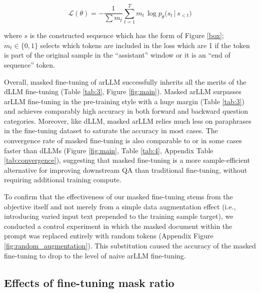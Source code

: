 \vskip -0.1in
\begin{equation}
\mathcal{L}(\theta) = - \frac{1}{\sum m_{t}}
\sum_{t=1}^{T} m_{t}\, \log p_{\theta}\!\big(s_{t}\,\big|\,s_{< t}\big)
\label{eq:2}
\end{equation}
\vskip -0.1in

where $s$ is the constructed sequence which has the form of Figure \ref{box}; $m_t\in\{0,1\}$ selects which tokens are included in the loss which are 1 if the token is part of the original sample in the ``assistant'' window or it is an ``end of sequence'' token.


Overall, masked fine-tuning of arLLM successfully inherits all the merits of the dLLM fine-tuning (Table \ref{tab:3}, Figure \ref{fig:main}). Masked arLLM surpasses arLLM fine-tuning in the pre-training style with a huge margin (Table \ref{tab:3}) and achieves comparably high accuracy in both forward and backward question categories. Moreover, like dLLM, masked arLLM relies much less on paraphrases in the fine-tuning dataset to saturate the accuracy in most cases. The convergence rate of masked fine-tuning is also comparable to or in some cases faster than dLLMs (Figure \ref{fig:main}, Table \ref{tab:4}, Appendix Table \ref{tab:convergence}), suggesting that masked fine-tuning is a more sample-efficient alternative for improving downstream QA than traditional fine-tuning, without requiring additional training compute.

To confirm that the effectiveness of our masked fine-tuning stems from the objective itself and not merely from a simple data augmentation effect (i.e., introducing varied input text prepended to the training sample target), we conducted a control experiment in which the masked document within the prompt was replaced entirely with random tokens (Appendix Figure \ref{fig:random_augmentation}). This substitution caused the accuracy of the masked fine-tuning to drop to the level of naive arLLM fine-tuning.

\subsection{Effects of fine-tuning mask ratio}

